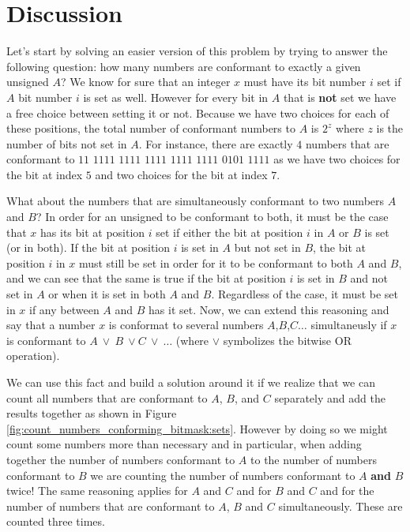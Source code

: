 \section{Discussion}
\label{count_numbers_conforming_bitmask:sec:discussion}
Let's start by solving an easier version of this problem by trying to answer the following question: how many numbers are conformant to exactly a given unsigned $A$?
We know for sure that an integer $x$ must have its bit number $i$ set if $A$ bit number $i$ is set as well. However for every bit in $A$  that is \textbf{not} set we have a free choice between setting it or not. 
Because we have two choices for each of these positions, the total number of conformant numbers to $A$ is $2^{z}$ where $z$ is the number of bits not set in $A$.
For instance, there are exactly $4$ numbers that are conformant to $\textrm{11 1111 1111 1111 1111 1111 0101 1111}$ as we have two choices for the bit at index $5$ and two choices for the bit at index $7$.

What about the numbers that are simultaneously conformant to two numbers $A$ and $B$? In order for an unsigned to be conformant to both, it must be the case that $x$ has its bit at position $i$ set if either the bit at position $i$ in $A$ or $B$ is set (or in both).
If the bit at position $i$ is set in $A$ but not set in $B$, the bit at position $i$ in $x$ must still be set in order for it to be conformant to both $A$ and $B$, and we can see that the same is true if the bit at position $i$ is set in $B$ and not set in $A$ or when it is set in both $A$ and $B$. Regardless of the case, it must be set in $x$ if any between $A$ and $B$ has it set.
Now, we can extend this reasoning and say that a number $x$ is conformat to several numbers $A$,$B$,$C\ldots$ simultaneusly if $x$ is conformant to $A \: \vee \: B \: \vee C \:  \vee \: \ldots$ (where $\vee$ symbolizes the bitwise OR operation).

We can use this fact and build a solution around it if we realize that we can count all numbers that are conformant to $A$, $B$, and $C$ separately and add the results together as shown in Figure \ref{fig:count_numbers_conforming_bitmask:sets}. However by doing so we might count some numbers more than necessary and in particular, when adding together the number of numbers conformant to $A$ to the number of numbers conformant to $B$ we are counting the number of numbers conformant to $A$ \textbf{and} $B$ twice! The same reasoning applies for $A$ and $C$ and for $B$ and $C$ and for the number of numbers that are conformant to $A$, $B$ and $C$ simultaneously. These are counted three times.

